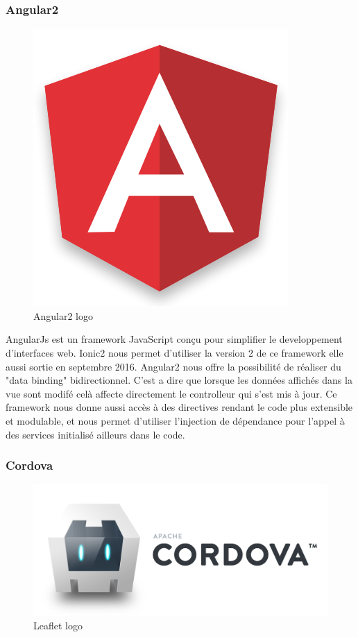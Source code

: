 \documentclass[french]{article}
\begin{document}
	\subsubsection{Angular2}
	
	\begin{figure}[H]
		\centering
		\includegraphics[scale=0.4]{../images/angular2-logo.png}
		\caption{Angular2 logo}
		\label{Angular2 logo}
	\end{figure} 
	
	AngularJs est un framework JavaScript conçu pour simplifier le developpement d'interfaces web. Ionic2 nous permet d'utiliser la version 2 de ce framework elle aussi sortie en septembre 2016. 
	Angular2 nous offre la possibilité de réaliser du "data binding" bidirectionnel. C'est a dire que lorsque les données affichés dans la vue sont modifé celà affecte directement le controlleur qui s'est mis à jour. Ce framework nous donne aussi accès à des directives rendant le code plus extensible et modulable, et nous permet d'utiliser l'injection de dépendance pour l'appel à des services initialisé ailleurs dans le code. 
	
	\subsubsection{Cordova}
	
	\begin{figure}[H]
		\centering
		\includegraphics[scale=0.4]{../images/cordova-logo.png}
		\caption{Leaflet logo}
		\label{Leaflet logo}
	\end{figure} 
	
\end{document}
